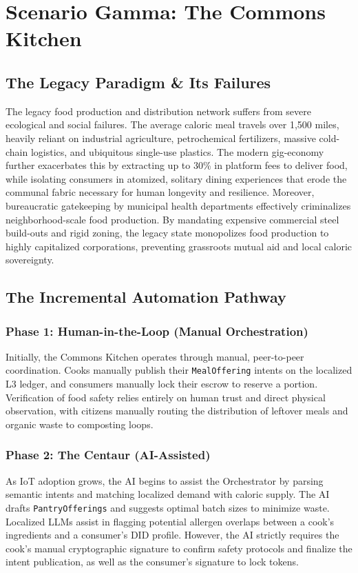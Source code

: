 \chapter{Scenario Gamma: The Commons Kitchen}

\section{The Legacy Paradigm \& Its Failures}
The legacy food production and distribution network suffers from severe ecological and social failures. The average caloric meal travels over 1,500 miles, heavily reliant on industrial agriculture, petrochemical fertilizers, massive cold-chain logistics, and ubiquitous single-use plastics. The modern gig-economy further exacerbates this by extracting up to 30\% in platform fees to deliver food, while isolating consumers in atomized, solitary dining experiences that erode the communal fabric necessary for human longevity and resilience. Moreover, bureaucratic gatekeeping by municipal health departments effectively criminalizes neighborhood-scale food production. By mandating expensive commercial steel build-outs and rigid zoning, the legacy state monopolizes food production to highly capitalized corporations, preventing grassroots mutual aid and local caloric sovereignty.

\section{The Incremental Automation Pathway}

\subsection{Phase 1: Human-in-the-Loop (Manual Orchestration)}
Initially, the Commons Kitchen operates through manual, peer-to-peer coordination. Cooks manually publish their \texttt{MealOffering} intents on the localized L3 ledger, and consumers manually lock their escrow to reserve a portion. Verification of food safety relies entirely on human trust and direct physical observation, with citizens manually routing the distribution of leftover meals and organic waste to composting loops.

\subsection{Phase 2: The Centaur (AI-Assisted)}
As IoT adoption grows, the AI begins to assist the Orchestrator by parsing semantic intents and matching localized demand with caloric supply. The AI drafts \texttt{PantryOfferings} and suggests optimal batch sizes to minimize waste. Localized LLMs assist in flagging potential allergen overlaps between a cook's ingredients and a consumer's DID profile. However, the AI strictly requires the cook's manual cryptographic signature to confirm safety protocols and finalize the intent publication, as well as the consumer's signature to lock tokens.

